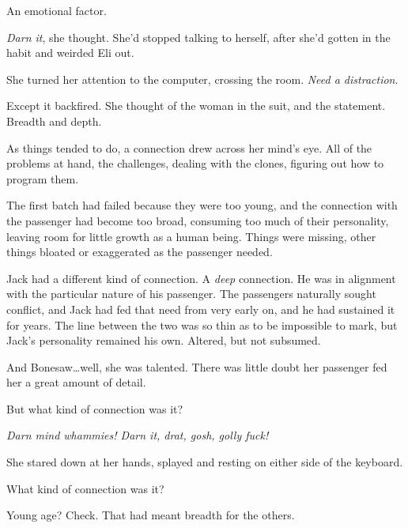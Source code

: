 An emotional factor.



\emph{Darn it}, she thought.  She'd stopped talking to herself, after she'd gotten in the habit and weirded Eli out.



She turned her attention to the computer, crossing the room.  \emph{Need a distraction}.



Except it backfired.  She thought of the woman in the suit, and the statement.  Breadth and depth.



As things tended to do, a connection drew across her mind's eye.  All of the problems at hand, the challenges, dealing with the clones, figuring out how to program them.



The first batch had failed because they were too young, and the connection with the passenger had become too broad, consuming too much of their personality, leaving room for little growth as a human being.  Things were missing, other things bloated or exaggerated as the passenger needed.



Jack had a different kind of connection.  A \emph{deep} connection.  He was in alignment with the particular nature of his passenger.  The passengers naturally sought conflict, and Jack had fed that need from very early on, and he had sustained it for years.  The line between the two was so thin as to be impossible to mark, but Jack's personality remained his own.  Altered, but not subsumed.



And Bonesaw\ldots well, she was talented.  There was little doubt her passenger fed her a great amount of detail.



But what kind of connection was it?



\emph{Darn mind whammies!  Darn it, drat, gosh, golly fuck!}



She stared down at her hands, splayed and resting on either side of the keyboard.



What kind of connection was it?



Young age?  Check.  That had meant breadth for the others.



